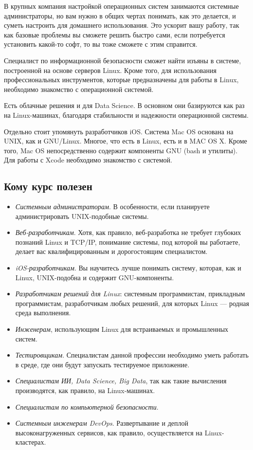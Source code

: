 \documentclass[14pt, a4paper]{article}
\begin{document}
В крупных компания настройкой операционных систем занимаются системные
администраторы, но вам нужно в общих чертах понимать, как это делается, и суметь настроить для
домашнего использования. Это ускорит вашу работу, так как базовые проблемы вы сможете решить
быстро сами, если потребуется установить какой-то софт, то вы тоже сможете с этим справится.

Специалист по информационной безопасности сможет найти изъяны в системе, построенной
на основе серверов Linux. Кроме того, для использования профессиональных инструментов, которые
предназначены для работы в Linux, необходимо знакомство с операционной системой.

Есть облачные решения и для Data Science. В основном они базируются как раз на
Linux-машинах, благодаря стабильности и надежности операционной системы.

Отдельно стоит упомянуть разработчиков iOS. Система Mac OS основана на UNIX, как и
GNU/Linux. Многое, что есть в Linux, есть и в MAC OS X. Кроме того, Mac OS непосредственно
содержит компоненты GNU (bash и утилиты). Для работы с Xcode необходимо знакомство с системой.

\subsection*{Кому курс полезен}
\begin{itemize}
    \item \textit{Системным администраторам}. В особенности, если планируете администрировать
    UNIX-подобные системы.
    \item \textit{Веб-разработчикам}. Хотя, как правило, веб-разработка не требует глубоких познаний Linux и
    TCP/IP, понимание системы, под которой вы работаете, делает вас квалифицированным и
    дорогостоящим специалистом.
    \item \textit{iOS-разработчикам}. Вы научитесь лучше понимать систему, которая, как и Linux,
    UNIX-подобна и содержит GNU-компоненты.
    \item \textit{Разработчикам решений для Linux}: системным программистам, прикладным программистам,
    разработчикам любых решений, для которых Linux — родная среда выполнения.
    \item \textit{Инженерам}, использующим Linux для встраиваемых и промышленных систем.
    \item \textit{Тестировщикам}. Специалистам данной профессии необходимо уметь работать в среде, где
    они будут запускать тестируемое приложение.
    \item \textit{Специалистам ИИ, Data Science, Big Data}, так как такие вычисления производятся, как
    правило, на Linux-машинах.
    \item \textit{Специалистам по компьютерной безопасности}.
    \item \textit{Системным инженерам DevOps}. Развертывание и деплой высоконагруженных сервисов, как
    правило, осуществляется на Linux-кластерах.
\end{itemize}
\newpage
\end{document}
